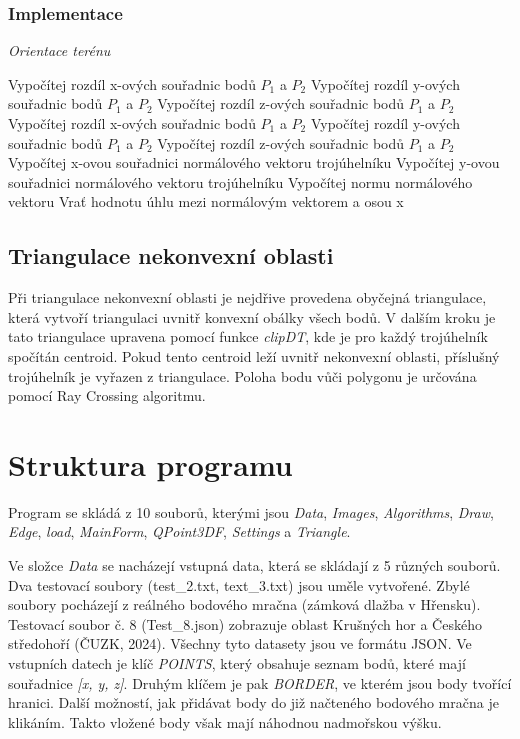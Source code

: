\documentclass{article}
\begin{document}
\begin{spacing}{1.5}
\subsubsection*{Implementace}
\begin{algorithm}[h]
    \caption {\textit{Orientace terénu}}
    \begin{algorithmic}[1]
        \State Vypočítej rozdíl x-ových souřadnic bodů $P_1$ a $P_2$
        \State Vypočítej rozdíl y-ových souřadnic bodů $P_1$ a $P_2$
        \State Vypočítej rozdíl z-ových souřadnic bodů $P_1$ a $P_2$
        \State Vypočítej rozdíl x-ových souřadnic bodů $P_1$ a $P_2$
        \State Vypočítej rozdíl y-ových souřadnic bodů $P_1$ a $P_2$
        \State Vypočítej rozdíl z-ových souřadnic bodů $P_1$ a $P_2$
        \State Vypočítej x-ovou souřadnici normálového vektoru trojúhelníku
        \State Vypočítej y-ovou souřadnici normálového vektoru trojúhelníku
        \State Vypočítej normu normálového vektoru
        \State Vrať hodnotu úhlu mezi normálovým vektorem a osou x
    \end{algorithmic}
\end{algorithm}

\subsection{Triangulace nekonvexní oblasti}
Při triangulace nekonvexní oblasti je nejdřive provedena obyčejná triangulace, která vytvoří triangulaci uvnitř konvexní obálky všech bodů. V dalším kroku je tato triangulace upravena pomocí funkce \textit{clipDT}, kde je pro každý trojúhelník spočítán centroid. Pokud tento centroid leží uvnitř nekonvexní oblasti, příslušný trojúhelník je  vyřazen  z triangulace. Poloha bodu vůči polygonu je určována pomocí Ray Crossing algoritmu.

\section{Struktura programu}
Program se skládá z 10 souborů, kterými jsou \textit{Data}, \textit{Images}, \textit{Algorithms}, \textit{Draw}, \textit{Edge}, \textit{load},\textit{ MainForm}, \textit{QPoint3DF}, \textit{Settings} a \textit{Triangle}.

Ve složce \textit{Data} se nacházejí vstupná data, která se skládají z 5 různých souborů. Dva testovací soubory (test\_2.txt, text\_3.txt) jsou uměle vytvořené. Zbylé soubory pocházejí z reálného bodového mračna (zámková dlažba v Hřensku). Testovací soubor č. 8 (Test\_8.json) zobrazuje oblast Krušných hor a Českého středohoří (ČUZK, 2024). Všechny tyto datasety jsou ve formátu JSON. Ve vstupních datech je klíč \textit{POINTS}, který obsahuje seznam bodů, které mají souřadnice \textit{[x, y, z]}. Druhým klíčem je pak \textit{BORDER}, ve kterém jsou body tvořící hranici. Další možností, jak přidávat body do již načteného bodového mračna je klikáním. Takto vložené body však mají náhodnou nadmořskou výšku.


\end{spacing}
\end{document}
